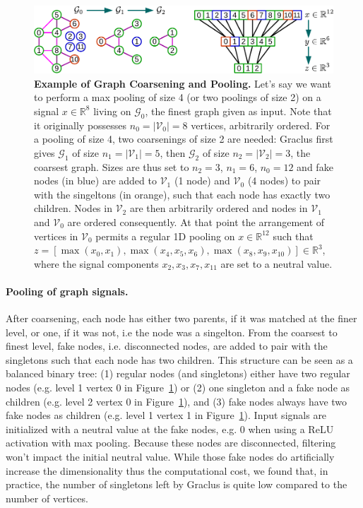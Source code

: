 \documentclass{article}
\newcommand{\G}{\mathcal{G}}
\newcommand{\V}{\mathcal{V}}
\newcommand{\R}{\mathbb{R}}
\newcommand{\figref}[1]{Figure~\ref{fig:#1}}
\begin{document}
\begin{figure}[ht]
\centering
\includegraphics[width=\textwidth]{images/coarsening_crop}
\caption{\textbf{Example of Graph Coarsening and Pooling.} Let's say we want to
perform a max pooling of size 4 (or two poolings of size 2) on a signal $x \in
\R^8$ living on $\G_0$, the finest graph given as input. Note that it originally
possesses $n_0 = |\V_0| = 8$ vertices, arbitrarily ordered. For a pooling of
size 4, two coarsenings of size 2 are needed: Graclus first gives $\G_1$ of size
$n_1 = |\V_1| = 5$, then $\G_2$ of size $n_2 = |\V_2| = 3$, the coarsest graph.
Sizes are thus set to $n_2 = 3$, $n_1 = 6$, $n_0 = 12$ and fake nodes (in blue)
are added to $\V_1$ (1 node) and $\V_0$ (4 nodes) to pair with the singeltons
(in orange), such that each node has exactly two children.  Nodes in $\V_2$ are
then arbitrarily ordered and nodes in $\V_1$ and $\V_0$ are ordered
consequently.  At that point the arrangement of vertices in $\V_0$ permits a
regular 1D pooling on $x \in \R^{12}$ such that $z = [\max(x_0,x_1),
\max(x_4,x_5,x_6), \max(x_8,x_9,x_{10})] \in \R^3$, where the signal components
$x_2,x_3,x_7,x_{11}$ are set to a neutral value.}
\label{fig:pooling}
\end{figure}

\paragraph{Pooling of graph signals.} After coarsening, each node has either two
parents, if it was matched at the finer level, or one, if it was not, i.e the
node was a singelton. From the coarsest to finest level, fake nodes, i.e.
disconnected nodes, are added to pair with the singletons such that each node
has two children. This structure can be seen as a balanced binary tree: (1)
regular nodes (and singletons) either have two regular nodes (e.g. level 1
vertex 0 in \figref{pooling}) or (2) one singleton and a fake node as children
(e.g. level 2 vertex 0 in \figref{pooling}), and (3) fake nodes always have two
fake nodes as children (e.g. level 1 vertex 1 in \figref{pooling}). Input
signals are initialized with a neutral value at the fake nodes, e.g. 0 when
using a ReLU activation with max pooling. Because these nodes are disconnected,
filtering won't impact the initial neutral value. While those fake nodes do
artificially increase the dimensionality thus the computational cost, we found
that, in practice, the number of singletons left by Graclus is quite low
compared to the number of vertices.
\end{document}
